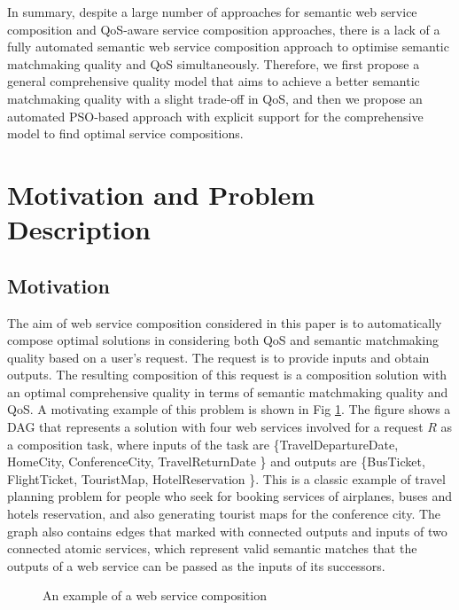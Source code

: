 \documentclass{llncs}
\begin{document}
In summary, despite a large number of approaches for semantic web service composition and QoS-aware service composition approaches, there is a lack of a fully automated semantic web service composition approach to optimise semantic matchmaking quality and QoS simultaneously. Therefore, we first propose a general comprehensive quality model that aims to achieve a better semantic matchmaking quality with a slight trade-off in QoS, and then we propose an automated PSO-based approach with explicit support for the comprehensive model to find optimal service compositions.

\section{Motivation and Problem Description}\label{problemDes}
\subsection{Motivation}\label{Motivation}

The aim of web service composition considered in this paper is to automatically compose optimal solutions in considering both QoS and semantic matchmaking quality based on a user's request. The request is to provide inputs and obtain outputs. The resulting composition of this request is a composition solution with an optimal comprehensive quality in terms of semantic matchmaking quality and QoS. A motivating example of this problem is shown in Fig \ref{motivation}. The figure shows a DAG that represents a solution with four web services involved for a request $R$ as a composition task, where inputs of the task are \{TravelDepartureDate, HomeCity, ConferenceCity, TravelReturnDate \} and outputs are \{BusTicket, FlightTicket, TouristMap, HotelReservation \}. This is a classic example of travel planning problem for people who seek for booking services of airplanes, buses and hotels reservation, and also generating tourist maps for the conference city. The graph also contains edges that marked with connected outputs and inputs of two connected atomic services, which represent valid semantic matches that the outputs of a web service can be passed as the inputs of its successors.

\begin{figure}[h]
\centering
{}
 \caption{ An example of a web service composition}
 \label{motivation}
\end{figure}
\end{document}
